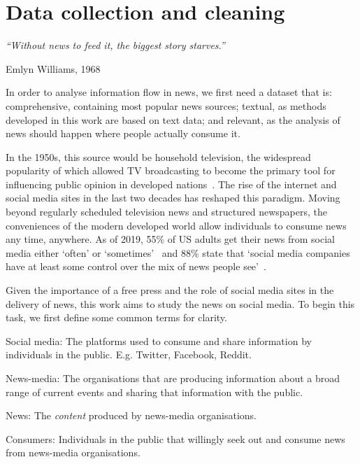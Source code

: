 \chapter{Data collection and cleaning}\label{ch:data}
\epigraph{\em ``Without news to feed it, the biggest story starves.''}{Emlyn Williams, 1968} %

In order to analyse information flow in news, we first need a dataset that is: comprehensive, containing most popular news sources; textual, as methods developed in this work are based on text data; and relevant, as the analysis of news should happen where people actually consume it.

In the 1950s, this source would be household television, the widespread popularity of which allowed TV broadcasting to become the primary tool for influencing public opinion in developed nations~\cite{abramson_electronic_1990}. 
The rise of the internet and social media sites in the last two decades has reshaped this paradigm. Moving beyond regularly scheduled television news and structured newspapers, the conveniences of the modern developed world allow individuals to consume news any time, anywhere. As of 2019, 55\% of US adults get their news from social media either `often' or `sometimes'~ and 88\% state that `social media companies have at least some control over the mix of news people see'~\cite{shearer_americans_2019}.

Given the importance of a free press and the role of social media sites in the delivery of news, this work aims to study the news on social media. To begin this task, we first define some common terms for clarity.

Social media: The platforms used to consume and share information by individuals in the public. E.g. Twitter, Facebook, Reddit.

News-media: The organisations that are producing information about a broad range of current events and sharing that information with the public.

News: The \emph{content} produced by news-media organisations. 

Consumers: Individuals in the public that willingly seek out and consume news from news-media organisations.

